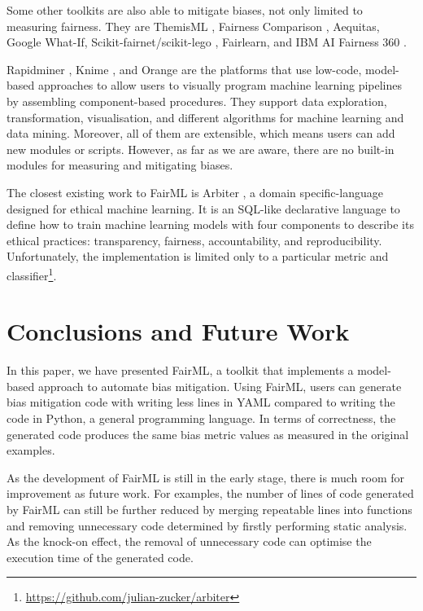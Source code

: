 \documentclass[sigconf,review]{acmart}
\begin{document}
Some other toolkits are also able to mitigate biases, not only limited to measuring fairness. They are ThemisML \cite{bantilan2018themis}, Fairness Comparison \cite{friedler2019fairness}, Aequitas\cite{saleiro2019aequitas}, Google What-If\cite{googlewhatif2020}, Scikit-fairnet/scikit-lego \cite{scikitfairness2022,scikitlego2022}, Fairlearn\cite{bird2020fairlearn}, and IBM AI Fairness 360 \cite{bellamy2018ai}.

Rapidminer \cite{hofmann2016rapidminer}, Knime \cite{berthold2008knime}, and Orange \cite{demsar2013orange} are the platforms that use low-code, model-based approaches to allow users to visually program machine learning pipelines by assembling component-based procedures. They support data exploration, transformation, visualisation, and different algorithms for machine learning and data mining. Moreover, all of them are extensible, which means users can add new modules or scripts. However, as far as we are aware, there are no built-in modules for measuring and mitigating biases. 

The closest existing work to FairML is Arbiter \cite{zucker2020arbiter}, a domain specific-language designed for ethical machine learning. It is an SQL-like declarative language to define how to train machine learning models with four components to describe its ethical practices: transparency, fairness, accountability, and reproducibility. Unfortunately, the implementation is limited only to a particular metric and classifier\footnote{\url{https://github.com/julian-zucker/arbiter}}.

\section{Conclusions and Future Work}
\label{sec:conclusions_and_future_work}
In this paper, we have presented FairML, a toolkit that implements a model-based approach to automate bias mitigation. Using FairML, users can generate bias mitigation code with writing less lines in YAML compared to writing the code in Python, a general programming language.
In terms of correctness, the generated code produces the same bias metric values as measured in the original examples.

As the development of FairML is still in the early stage, 
there is much room for improvement as future work. For examples, the number of lines of code generated by FairML can still be further reduced by merging repeatable lines into functions and removing unnecessary code determined by firstly performing static analysis. 
As the knock-on effect, the removal of unnecessary code can optimise the execution time of the generated code. 
\end{document}

